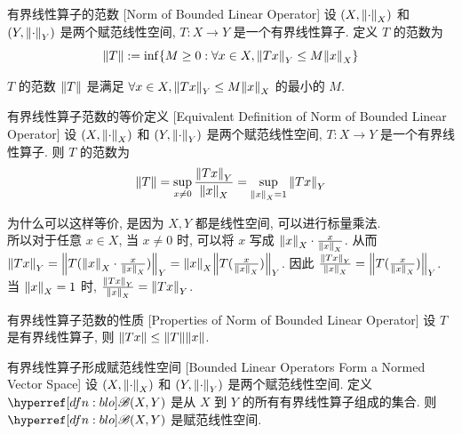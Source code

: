         \begin{dfn}
            {有界线性算子的范数}
            [Norm of Bounded Linear Operator]
            设 \((X, \norm{\cdot}_X)\) 和 \((Y, \norm{\cdot}_Y)\) 是两个赋范线性空间, \(T:X\to Y\) 是一个有界线性算子. 定义 \(T\) 的范数为
            \[\norm{T}:=\inf\{M\geq 0 : \forall x\in X, \norm{Tx}_Y\leq M\norm{x}_X\}\]
        \end{dfn}

        \begin{rmk}
            [Dedicatia]
            \(T\) 的范数 \(\norm{T}\) 是满足 \(\forall x\in X, \norm{Tx}_Y\leq M\norm{x}_X\) 的最小的 \(M\).
        \end{rmk}

        \begin{ppt}
            {有界线性算子范数的等价定义}
            [Equivalent Definition of Norm of Bounded Linear Operator]
            设 \((X, \norm{\cdot}_X)\) 和 \((Y, \norm{\cdot}_Y)\) 是两个赋范线性空间, \(T:X\to Y\) 是一个有界线性算子. 则 \(T\) 的范数为
            \[\norm{T}=\sup_{x\neq 0}\frac{\norm{Tx}_Y}{\norm{x}_X}=\sup_{\norm{x}_X=1}\norm{Tx}_Y\]
        \end{ppt}

        \begin{rmk}
            [Dedicatia]
            为什么可以这样等价, 是因为 \(X,Y\) 都是线性空间, 可以进行标量乘法. \\
            所以对于任意 \(x\in X\), 当 \(x\neq 0\) 时, 可以将 \(x\) 写成 \(\norm{x}_X\cdot\frac{x}{\norm{x}_X}\). 从而 \(\norm{Tx}_Y=\norm{T(\norm{x}_X\cdot\frac{x}{\norm{x}_X})}_Y=\norm{x}_X\norm{T(\frac{x}{\norm{x}_X})}_Y\). 因此 \(\frac{\norm{Tx}_Y}{\norm{x}_X}=\norm{T(\frac{x}{\norm{x}_X})}_Y\). 当 \(\norm{x}_X=1\) 时, \(\frac{\norm{Tx}_Y}{\norm{x}_X}=\norm{Tx}_Y\).
        \end{rmk}

        \begin{ppt}
            {有界线性算子范数的性质}
            [Properties of Norm of Bounded Linear Operator]
            设 \(T\) 是有界线性算子, 则 \(\norm{Tx}\leq\norm{T}\norm{x}\).
        \end{ppt}

        \begin{ppt}
            {有界线性算子形成赋范线性空间}
            [Bounded Linear Operators Form a Normed Vector Space]
            设 \((X, \norm{\cdot}_X)\) 和 \((Y, \norm{\cdot}_Y)\) 是两个赋范线性空间. 定义 \(\blo(X,Y)\) 是从 \(X\) 到 \(Y\) 的所有有界线性算子组成的集合. 则 \(\blo(X,Y)\) 是赋范线性空间.
        \end{ppt}

